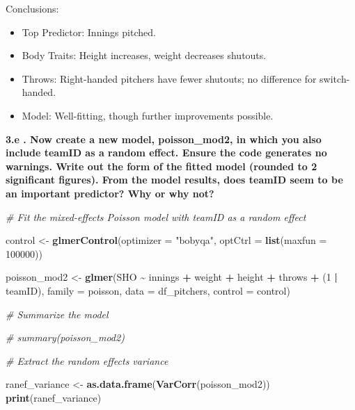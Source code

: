\documentclass[
]{article}
\newenvironment{Shaded}{\begin{snugshade}}{\end{snugshade}}
\newcommand{\AttributeTok}[1]{\textcolor[rgb]{0.13,0.29,0.53}{#1}}
\newcommand{\CommentTok}[1]{\textcolor[rgb]{0.56,0.35,0.01}{\textit{#1}}}
\newcommand{\DecValTok}[1]{\textcolor[rgb]{0.00,0.00,0.81}{#1}}
\newcommand{\FunctionTok}[1]{\textcolor[rgb]{0.13,0.29,0.53}{\textbf{#1}}}
\newcommand{\NormalTok}[1]{#1}
\newcommand{\OtherTok}[1]{\textcolor[rgb]{0.56,0.35,0.01}{#1}}
\newcommand{\SpecialCharTok}[1]{\textcolor[rgb]{0.81,0.36,0.00}{\textbf{#1}}}
\newcommand{\StringTok}[1]{\textcolor[rgb]{0.31,0.60,0.02}{#1}}
\begin{document}
Conclusions:

\begin{itemize}
\item
  Top Predictor: Innings pitched.
\item
  Body Traits: Height increases, weight decreases shutouts.
\item
  Throws: Right-handed pitchers have fewer shutouts; no difference for
  switch-handed.
\item
  Model: Well-fitting, though further improvements possible.
\end{itemize}

\textbf{3.e . Now create a new model, poisson\_mod2, in which you also
include teamID as a random effect. Ensure the code generates no
warnings. Write out the form of the fitted model (rounded to 2
significant figures). From the model results, does teamID seem to be an
important predictor? Why or why not?}

\begin{Shaded}
\begin{Highlighting}[]
\CommentTok{\# Fit the mixed{-}effects Poisson model with teamID as a random effect}

\NormalTok{control }\OtherTok{\textless{}{-}} \FunctionTok{glmerControl}\NormalTok{(}\AttributeTok{optimizer =} \StringTok{"bobyqa"}\NormalTok{, }\AttributeTok{optCtrl =} \FunctionTok{list}\NormalTok{(}\AttributeTok{maxfun =} \DecValTok{100000}\NormalTok{))}

\NormalTok{poisson\_mod2 }\OtherTok{\textless{}{-}} \FunctionTok{glmer}\NormalTok{(SHO }\SpecialCharTok{\textasciitilde{}}\NormalTok{ innings }\SpecialCharTok{+}\NormalTok{ weight }\SpecialCharTok{+}\NormalTok{ height }\SpecialCharTok{+}\NormalTok{ throws }\SpecialCharTok{+}\NormalTok{ (}\DecValTok{1} \SpecialCharTok{|}\NormalTok{ teamID), }
                      \AttributeTok{family =}\NormalTok{ poisson, }\AttributeTok{data =}\NormalTok{ df\_pitchers, }\AttributeTok{control =}\NormalTok{ control)}

\CommentTok{\# Summarize the model}

\CommentTok{\# summary(poisson\_mod2)}

\CommentTok{\# Extract the random effects variance}

\NormalTok{ranef\_variance }\OtherTok{\textless{}{-}} \FunctionTok{as.data.frame}\NormalTok{(}\FunctionTok{VarCorr}\NormalTok{(poisson\_mod2))}
\FunctionTok{print}\NormalTok{(ranef\_variance)}
\end{Highlighting}
\end{Shaded}
\end{document}
